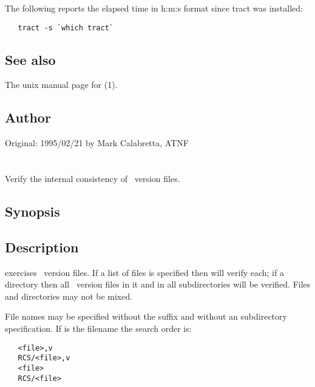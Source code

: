 The following reports the elapsed time in h:m:s format since tract was
installed:

\begin{verbatim}
   tract -s `which tract`
\end{verbatim}

\subsection*{See also}

The unix manual page for (1).

\subsection*{Author}

Original: 1995/02/21 by Mark Calabretta, ATNF


\newpage
\section{}
\label{xrcs}

Verify the internal consistency of \rcs\ version files.

\subsection*{Synopsis}

\begin{synopsis}
\end{synopsis}

\subsection*{Description}

 exercises \rcs\ version files.  If a list of files is specified
then  will verify each; if a directory then all \rcs\ version files
in it and in all subdirectories will be verified.  Files and directories may
not be mixed.

File names may be specified without the  suffix and without an
 subdirectory specification.  If  is the filename the
search order is:

\begin{verbatim}
   <file>,v
   RCS/<file>,v
   <file>
   RCS/<file>
\end{verbatim}

